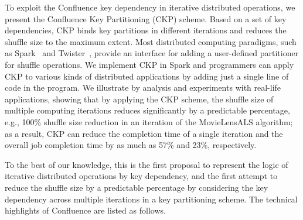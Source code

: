 \documentclass[10pt,journal,compsoc]{IEEEtran}
\begin{document}
To exploit the Confluence key dependency in iterative distributed operations, 
we present the Confluence Key Partitioning (CKP) scheme. 
Based on a set of key dependencies, CKP binds key partitions in 
different iterations and reduces the shuffle size to the maximum
extent. 
Most distributed computing paradigms, such as Spark~\cite{zaharia2012resilient} and Twister~\cite{ekanayake2010twister},
provide an interface for adding a user-defined partitioner for shuffle operations.
We implement CKP in Spark and programmers can apply CKP to various 
kinds of distributed applications by adding just a single line of code
in the program.
We illustrate by analysis and experiments with real-life applications,
showing that by applying the CKP scheme, 
the shuffle size of multiple computing
iterations reduces significantly by a predictable percentage, 
e.g., 100\% shuffle size reduction in an iteration of the MovieLensALS
algorithm;
as a result, CKP can reduce the completion time of a single iteration and the overall job completion time by as much as 57\% and 23\%, respectively. 

To the best of our knowledge, %
this is the first proposal to
represent the logic of iterative distributed operations
by key dependency, and the first attempt to reduce the 
shuffle size by a predictable percentage by considering the key dependency 
across multiple iterations in a key partitioning scheme.
The technical highlights of Confluence are listed as follows.
\end{document}
